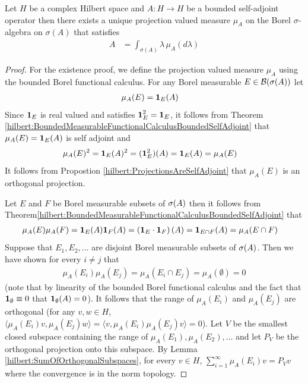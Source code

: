 \begin{thm}\label{hilbert:SpectralTheoremBoundSelfAdjointProjectionValuedMeasure}Let $H$ be a complex Hilbert space and $A : H \to H$ be a bounded self-adjoint operator then there exists a unique projection valued measure $\mu_A$ on the Borel $\sigma$-algebra on $\sigma(A)$ that satisfies
\begin{align*}
A &= \int_{\sigma(A)} \lambda  \, \mu_A(d\lambda)
\end{align*}
\end{thm}
\begin{proof}
For the existence proof, we define the projection valued measure $\mu_A$ using the bounded Borel functional calculus.  For any Borel measurable $E \in \mathcal{B}(\sigma(A))$ let
\begin{align*}
\mu_A(E) &= \textbf{1}_{E}(A)
\end{align*}
Since $\textbf{1}_{E}$ is real valued and satisfies
$\textbf{1}_{E}^2  = \textbf{1}_{E}$, it follows from Theorem
\ref{hilbert:BoundedMeasurableFunctionalCalculusBoundedSelfAdjoint}
that $\mu_A(E) = \textbf{1}_{E}(A)$ is self adjoint and 
\begin{align*}
\mu_A(E)^2 &= \textbf{1}_{E}(A)^2 = (\textbf{1}_{E}^2)(A) = \textbf{1}_{E}(A) = \mu_A(E)
\end{align*}  
It follows from Propostion \ref{hilbert:ProjectionsAreSelfAdjoint} that $\mu_A(E)$ is an orthogonal projection.

Let $E$ and $F$ be Borel measurable subsets of $\sigma(A)$ then
it follows from Theorem\ref{hilbert:BoundedMeasurableFunctionalCalculusBoundedSelfAdjoint}
that
\begin{align*}
  \mu_A(E) \mu_A(F) &= \textbf{1}_{E}(A) \textbf{1}_{F}(A)
                      =\left(\textbf{1}_{E} \cdot \textbf{1}_{F}\right)(A) =
                      \textbf{1}_{E\cap F}(A) = \mu_A(E \cap F)
\end{align*}
Suppose that $E_1, E_2, \dotsc$ are disjoint Borel measurable subsets of $\sigma(A)$.  Then we have shown for every $i \neq j$ that 
\begin{align*}
\mu_A(E_i) \mu_A(E_j) = \mu_A(E_i \cap E_j) = \mu_A(\emptyset) = 0
\end{align*}
(note that by linearity of the bounded Borel functional calculus and the fact that $\textbf{1}_{\emptyset} \equiv 0$ that $\textbf{1}_{\emptyset}(A) = 0$).  It follows that the range of $\mu_A(E_i)$ and $\mu_A(E_j)$ are orthogonal (for any $v,w \in H$, $\langle \mu_A(E_i) v, \mu_A(E_j) w \rangle = \langle v, \mu_A(E_i) \mu_A(E_j) v \rangle = 0$).  Let $V$ be the smallest closed subspace containing the range of $\mu_A(E_1), \mu_A(E_2), \dotsc$ and let $P_V$ be the orthogonal projection onto this subspace.  By Lemma \ref{hilbert:SumOfOrthogonalSubspaces}, for every $v \in H$, $\sum_{i=1}^\infty \mu_A(E_i)v = P_V v$ where the convergence is in the norm topology.


\end{proof}
